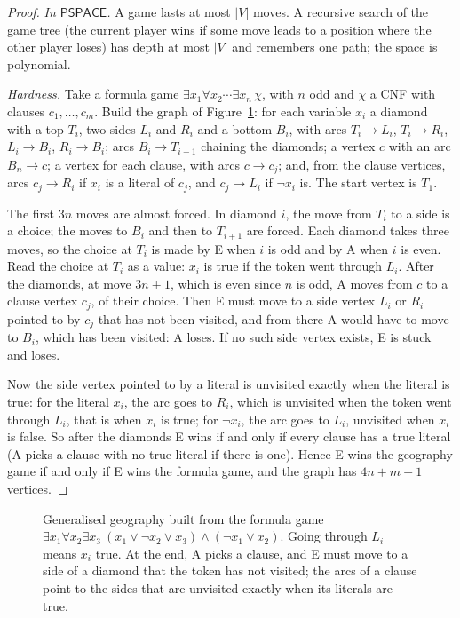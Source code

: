 \begin{proof}
\emph{In $\mathsf{PSPACE}$.} A game lasts at most $|V|$ moves. A recursive search of the game tree (the current player wins if some move leads to a position where the other player loses) has depth at most $|V|$ and remembers one path; the space is polynomial.

\emph{Hardness.} Take a formula game $\exists x_1\forall x_2\cdots\exists x_n\,\chi$, with $n$ odd and $\chi$ a CNF with clauses $c_1,\dots,c_m$. Build the graph of Figure~\ref{fig:geography}: for each variable $x_i$ a diamond with a top $T_i$, two sides $L_i$ and $R_i$ and a bottom $B_i$, with arcs $T_i\to L_i$, $T_i\to R_i$, $L_i\to B_i$, $R_i\to B_i$; arcs $B_i\to T_{i+1}$ chaining the diamonds; a vertex $c$ with an arc $B_n\to c$; a vertex for each clause, with arcs $c\to c_j$; and, from the clause vertices, arcs $c_j\to R_i$ if $x_i$ is a literal of $c_j$, and $c_j\to L_i$ if $\neg x_i$ is. The start vertex is $T_1$.

The first $3n$ moves are almost forced. In diamond $i$, the move from $T_i$ to a side is a choice; the moves to $B_i$ and then to $T_{i+1}$ are forced. Each diamond takes three moves, so the choice at $T_i$ is made by E when $i$ is odd and by A when $i$ is even. Read the choice at $T_i$ as a value: $x_i$ is true if the token went through $L_i$. After the diamonds, at move $3n+1$, which is even since $n$ is odd, A moves from $c$ to a clause vertex $c_j$, of their choice. Then E must move to a side vertex $L_i$ or $R_i$ pointed to by $c_j$ that has not been visited, and from there A would have to move to $B_i$, which has been visited: A loses. If no such side vertex exists, E is stuck and loses.

Now the side vertex pointed to by a literal is unvisited exactly when the literal is true: for the literal $x_i$, the arc goes to $R_i$, which is unvisited when the token went through $L_i$, that is when $x_i$ is true; for $\neg x_i$, the arc goes to $L_i$, unvisited when $x_i$ is false. So after the diamonds E wins if and only if every clause has a true literal (A picks a clause with no true literal if there is one). Hence E wins the geography game if and only if E wins the formula game, and the graph has $4n+m+1$ vertices.
\end{proof}

\begin{figure}[ht]
\centering
{}
\caption{Generalised geography built from the formula game $\exists x_1\forall x_2\exists x_3\ (x_1\lor\neg x_2\lor x_3)\land(\neg x_1\lor x_2)$. Going through $L_i$ means $x_i$ true. At the end, A picks a clause, and E must move to a side of a diamond that the token has not visited; the arcs of a clause point to the sides that are unvisited exactly when its literals are true.}
\label{fig:geography}
\end{figure}


